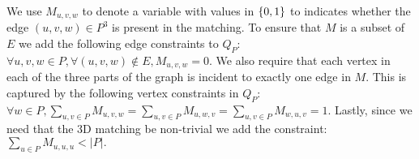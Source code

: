 \documentclass[11pt]{article}
\begin{document}

We use $M_{u,v,w}$ to denote a variable with
values in $\left\{ 0,1 \right\}$ to indicates whether the edge $(u,v,w) \in
P^3$ is present in the matching.
To ensure that $M$ is a subset of $E$ we add the following edge constraints to $Q_P$:
  $\forall u,v,w \in P, \forall (u, v, w) \not\in E, M_{u,v,w} = 0.$
We also require that each vertex in
each of the three parts of the graph is incident to exactly one edge
in $M$.  This is captured by the following vertex constraints in $Q_P$:
$\forall w \in P, \sum_{u,v \in P} M_{u,v,w} = \sum_{u,v \in P} M_{u,w,v} = \sum_{u,v \in P} M_{w,u,v} = 1.$
Lastly, since we need that the 3D matching be non-trivial we
add the constraint:
  $\sum_{u \in P} M_{u,u,u} < |P|.$



\end{document}
